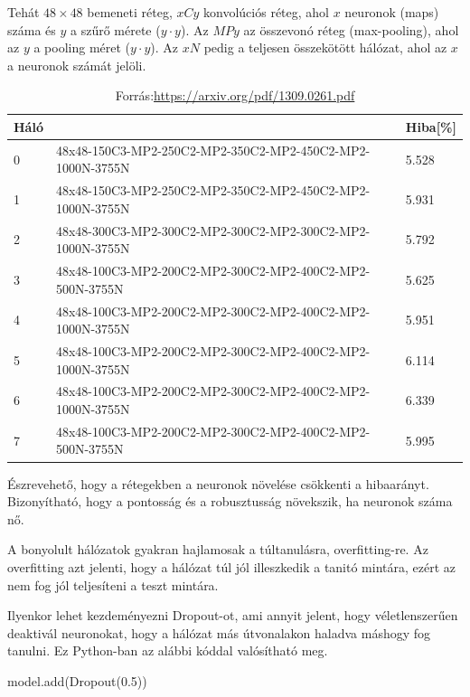 Tehát $48 \times 48$ bemeneti réteg, $xCy$ konvolúciós réteg, ahol $x$ neuronok (maps) száma és $y$ a szűrő mérete ($y \cdot y$). Az $MPy$ az összevonó réteg (max-pooling), ahol az $y$ a pooling méret ($y \cdot y$). Az $xN$ pedig a teljesen összekötött hálózat, ahol az $x$ a neuronok számát jelöli.

\begin{table}[h]
\centering
\caption{Forrás:\url{https://arxiv.org/pdf/1309.0261.pdf}}
\begin{tabular}{|l|l|l|}
\hline
 Háló &                                                                      & Hiba[\%] \\ \hline
0               & 48x48-150C3-MP2-250C2-MP2-350C2-MP2-450C2-MP2-1000N-3755N & 5.528 \\ \hline
1               & 48x48-150C3-MP2-250C2-MP2-350C2-MP2-450C2-MP2-1000N-3755N & 5.931 \\ \hline
2               & 48x48-300C3-MP2-300C2-MP2-300C2-MP2-300C2-MP2-1000N-3755N & 5.792 \\ \hline
3               & 48x48-100C3-MP2-200C2-MP2-300C2-MP2-400C2-MP2-500N-3755N  & 5.625 \\ \hline
4               & 48x48-100C3-MP2-200C2-MP2-300C2-MP2-400C2-MP2-1000N-3755N & 5.951 \\ \hline
5               & 48x48-100C3-MP2-200C2-MP2-300C2-MP2-400C2-MP2-1000N-3755N & 6.114 \\ \hline
6               & 48x48-100C3-MP2-200C2-MP2-300C2-MP2-400C2-MP2-1000N-3755N & 6.339 \\ \hline
7               & 48x48-100C3-MP2-200C2-MP2-300C2-MP2-400C2-MP2-500N-3755N  & 5.995 \\ \hline
\end{tabular}
\end{table}

Észrevehető, hogy a rétegekben a neuronok növelése csökkenti a hibaarányt. Bizonyítható, hogy a pontosság és a robusztusság növekszik, ha neuronok száma nő.

A bonyolult hálózatok gyakran hajlamosak a túltanulásra, overfitting-re. Az overfitting azt jelenti, hogy a hálózat túl jól illeszkedik a tanitó mintára, ezért az nem fog jól teljesíteni a teszt mintára.

Ilyenkor lehet kezdeményezni Dropout-ot, ami annyit jelent, hogy véletlenszerűen deaktivál neuronokat, hogy a hálózat más útvonalakon haladva máshogy fog tanulni. Ez Python-ban az alábbi kóddal valósítható meg.
\begin{python}
model.add(Dropout(0.5))
\end{python}


